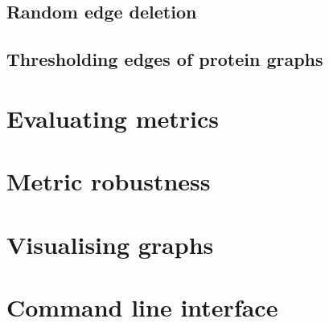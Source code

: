 \subsection{Random edge deletion}

\subsection{Thresholding edges of protein graphs}


\section{Evaluating metrics}


\section{Metric robustness}


\section{Visualising graphs}


\section{Command line interface}


